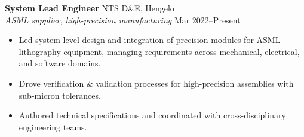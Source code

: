 \documentclass[10pt,a4paper]{article}
\begin{document}
\textbf{System Lead Engineer} \hfill NTS D\&E, Hengelo \\
{\small\textit{ASML supplier, high-precision manufacturing}} \hfill {\small Mar 2022--Present}
\begin{itemize}
 \item Led system-level design and integration of precision modules for ASML lithography equipment, managing requirements across mechanical, electrical, and software domains.
 \item Drove verification \& validation processes for high-precision assemblies with sub-micron tolerances.
 \item Authored technical specifications and coordinated with cross-disciplinary engineering teams.
\end{itemize}
\end{document}
